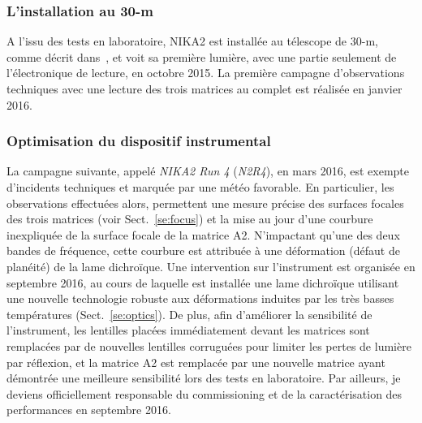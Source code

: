 \subsubsection{L'installation au 30-m}
A l'issu des tests en laboratoire, NIKA2 est installée au télescope de
30-m, comme décrit dans~\citet{Adam2018}, et voit sa première lumière,
avec une partie seulement de l'électronique de lecture, en octobre
2015. La première campagne d'observations techniques avec une lecture
des trois matrices au complet est réalisée en janvier 2016.

\subsubsection{Optimisation du dispositif instrumental}
La campagne suivante, appelé \emph{NIKA2 Run 4} (\emph{N2R4}), en mars
2016, est exempte d'incidents techniques et marquée par une météo
favorable. En particulier, les observations effectuées alors,
permettent une mesure précise des surfaces focales des trois matrices
(voir Sect.~\ref{se:focus}) et la mise au jour d'une courbure
inexpliquée de la surface focale de la matrice A2. N'impactant qu'une
des deux bandes de fréquence, cette courbure est attribuée à une
déformation (défaut de planéité) de la lame dichroïque. Une
intervention sur l'instrument est organisée en
septembre 2016, au cours de laquelle est installée une lame dichroïque
utilisant une nouvelle technologie robuste aux
déformations induites par les très basses températures
(Sect.~\ref{se:optics}). De plus, afin d'améliorer la sensibilité de
l'instrument, les lentilles placées immédiatement devant les matrices
sont remplacées par de nouvelles lentilles corruguées pour limiter
les pertes de lumière par réflexion, et la matrice A2 est remplacée
par une nouvelle matrice ayant démontrée une meilleure sensibilité
lors des tests en laboratoire. Par ailleurs, je deviens officiellement
responsable du commissioning et de la caractérisation des performances
en septembre 2016.

